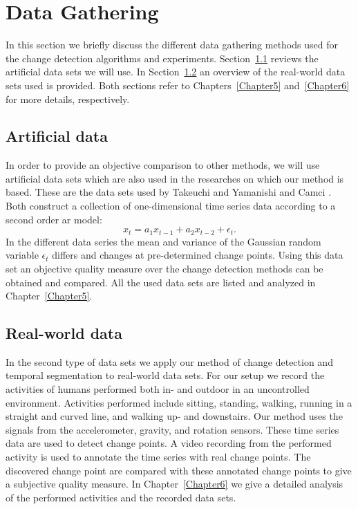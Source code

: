 \section{Data Gathering}\label{sec:method_data_gathering}
In this section we briefly discuss the different data gathering methods used for the change detection algorithms and experiments.
Section~\ref{subsec:data_gathering_artificial} reviews the artificial data sets we will use.
In Section~\ref{subsec:data_gathering_real_world} an overview of the real-world data sets used is provided.
Both sections refer to Chapters~\ref{Chapter5} and~\ref{Chapter6} for more details, respectively.

\subsection{Artificial data}\label{subsec:data_gathering_artificial}
In order to provide an objective comparison to other methods, we will use artificial data sets which are also used in the researches on which our method is based.
These are the data sets used by Takeuchi and Yamanishi \cite{takeuchi2006unifying} and Camci \cite{camci2010change}.
Both construct a collection of one-dimensional time series data according to a second order \gls{ar} model:
\begin{equation}
  x_t = a_1 x_{t-1} + a_2 x_{t-2} + \epsilon_t.
\end{equation}
In the different data series the mean and variance of the Gaussian random variable $\epsilon_t$ differs and changes at pre-determined change points.
Using this data set an objective quality measure over the change detection methods can be obtained and compared.
All the used data sets are listed and analyzed in Chapter~\ref{Chapter5}.

\subsection{Real-world data}\label{subsec:data_gathering_real_world}
In the second type of data sets we apply our method of change detection and temporal segmentation to real-world data sets.
For our setup we record the activities of humans performed both in- and outdoor in an uncontrolled environment.
Activities performed include sitting, standing, walking, running in a straight and curved line, and walking up- and downstairs.
Our method uses the signals from the accelerometer, gravity, and rotation sensors.
These time series data are used to detect change points.
A video recording from the performed activity is used to annotate the time series with real change points.
The discovered change point are compared with these annotated change points to give a subjective quality measure.
In Chapter~\ref{Chapter6} we give a detailed analysis of the performed activities and the recorded data sets.

